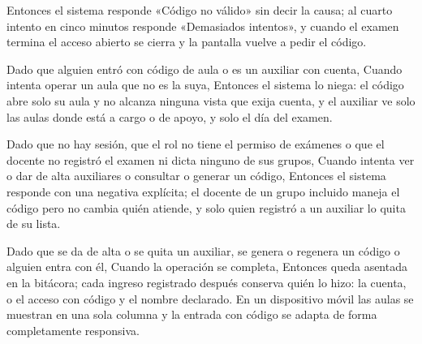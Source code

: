 {      Entonces el sistema responde «Código no válido» sin decir la causa; al cuarto
      intento en cinco minutos responde «Demasiados intentos», y cuando el examen termina
      el acceso abierto se cierra y la pantalla vuelve a pedir el código.
\item Dado que alguien entró con código de aula o es un auxiliar con cuenta, Cuando
      intenta operar un aula que no es la suya, Entonces el sistema lo niega: el código
      abre solo su aula y no alcanza ninguna vista que exija cuenta, y el auxiliar ve
      solo las aulas donde está a cargo o de apoyo, y solo el día del examen.
\item Dado que no hay sesión, que el rol no tiene el permiso de exámenes o que el docente
      no registró el examen ni dicta ninguno de sus grupos, Cuando intenta ver o dar de
      alta auxiliares o consultar o generar un código, Entonces el sistema responde con
      una negativa explícita; el docente de un grupo incluido maneja el código pero no
      cambia quién atiende, y solo quien registró a un auxiliar lo quita de su lista.
\item Dado que se da de alta o se quita un auxiliar, se genera o regenera un código o
      alguien entra con él, Cuando la operación se completa, Entonces queda asentada en la
      bitácora; cada ingreso registrado después conserva quién lo hizo: la cuenta, o el
      acceso con código y el nombre declarado. En un dispositivo móvil las aulas se
      muestran en una sola columna y la entrada con código se adapta de forma
      completamente responsiva.}

\def\HUMockupsExtra{%
\CajaMockup{hu18-codigo}{7.8cm} & \CajaMockup{hu18-acceso-aula}{7.8cm}}

